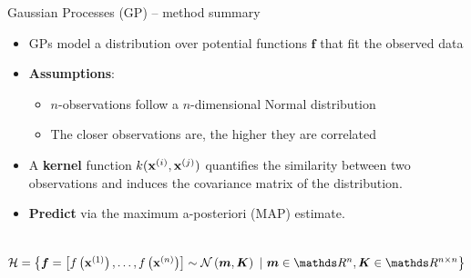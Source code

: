 
\begin{frame}{Gaussian Processes (GP) -- method summary}

   

\medskip

\begin{itemize}
  \item GPs model a distribution over potential functions $\bm{f}$ that fit the observed data
  \item \textbf{Assumptions}:
  \begin{itemize}
     \item $n$-observations follow a $n$-dimensional Normal distribution
     \item The closer observations are, the higher they are correlated
  \end{itemize}
  \item A \textbf{kernel} function $k(\mathbf{x}^{(i)}, \mathbf{x}^{(j)})$ quantifies the similarity between two observations and induces the covariance matrix of the distribution. 
  \item \textbf{Predict} via the maximum a-posteriori (MAP) estimate.
\end{itemize}

\medskip

 ~~
$\Hspace = \left\{ \bm{f} = \left[f\left(\xi[1]\right), \dots, f\left(\xi[n]\right)\right] \sim \mathcal{N}\left(\bm{m}, \bm{K}\right) ~|~ \bm{m} \in \R^n, \bm{K} \in \R^{n\times n} \right\}$

\medskip


\end{frame}
